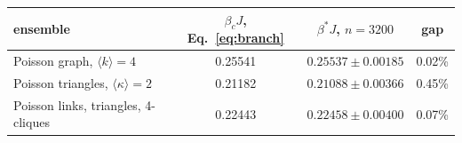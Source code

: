 \begin{tabular}{@{}lccc@{}}
\hline\hline
ensemble & $\beta_{c}J$, Eq.~\eqref{eq:branch} & $\beta^{*}J$, $n=3200$ & gap\\
\hline
Poisson graph, $\langle k\rangle=4$ & 0.25541 & $0.25537\pm0.00185$ & 0.02\%\\
Poisson triangles, $\langle\kappa\rangle=2$ & 0.21182 & $0.21088\pm0.00366$ & 0.45\%\\
Poisson links, triangles, 4-cliques & 0.22443 & $0.22458\pm0.00400$ & 0.07\%\\
\hline\hline
\end{tabular}
